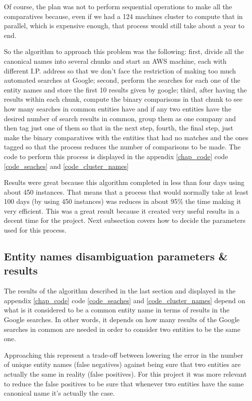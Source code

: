 Of course, the plan was not to perform sequential operations to make all the comparatives because, even if we had a 124 machines cluster to compute that in parallel, which is expensive enough, that process would still take about a year to end.

So the algorithm to approach this problem was the following: first, divide all the canonical names into several chunks and start an AWS machine, each with different I.P. address so that we don't face the restriction of making too much automated searches at Google; second, perform the searches for each one of the entity names and store the first 10 results given by google; third, after having the results within each chunk, compute the binary comparisons in that chunk to see how many searches in common entities have and if any two entities have the desired number of search results in common, group them as one company and then tag just one of them so that in the next step, fourth, the final step, just make the binary comparatives with the entities that had no matches and the ones tagged so that the process reduces the number of comparisons to be made. The code to perform this process is displayed in the  appendix \ref{chap_code} code \ref{code_seaches} and \ref{code_cluster_names}

Results were great because this algorithm completed in less than four days using about 450 instances. That means that a process that would normally take at least 100 days (by using 450 instances) was reduces in about 95\% the time making it very efficient. This was a great result because it created very useful results in a decent time for the project. Next subsection covers how to decide the parameters used for this process.

\subsection{Entity names disambiguation parameters \& results}

The results of the algorithm described in the last section and displayed in  the  appendix \ref{chap_code} code \ref{code_seaches} and \ref{code_cluster_names} depend on what is it considered to be a common entity name in terms of results in the Google searches. In other words, it depends on how many results of the Google searches in common are needed in order to consider two entities to be the same one.

Approaching this represent a trade-off between lowering the error in the number of unique entity names (false negatives) against being sure that two entities are actually the same in reality (false positives). For this project it was more relevant to reduce the false positives to be sure that whenever two entities have the same canonical name it's actually the case.

